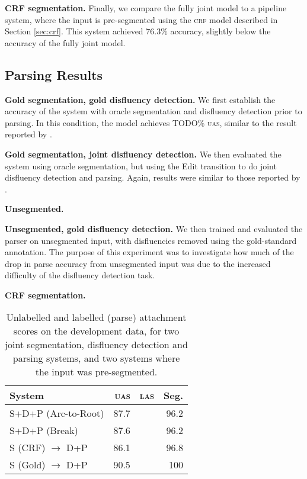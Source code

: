 \documentclass[11pt,letterpaper]{article}
\begin{document}
\textbf{CRF segmentation.} 
Finally, we compare the fully joint model to a pipeline system, where the input
is pre-segmented using the \textsc{crf} model described in Section \ref{sec:crf}.
This system achieved 76.3\% accuracy, slightly below the accuracy of the fully
joint model.

\subsection{Parsing Results}

\textbf{Gold segmentation, gold disfluency detection.}
We first establish the accuracy of the system with oracle segmentation and
disfluency detection prior to parsing.  In this condition, the model achieves
TODO\% \textsc{uas}, similar to the result reported by \citet{honnibal:14}.

\textbf{Gold segmentation, joint disfluency detection.} We then evaluated the
system using oracle segmentation, but using the Edit transition to do joint
disfluency detection and parsing.  Again,  results were similar to those reported
by \citet{honnibal:14}.

\textbf{Unsegmented.}

\textbf{Unsegmented, gold disfluency detection.}  We then trained and evaluated
the parser on unsegmented input, with disfluencies removed using the gold-standard
annotation.  The purpose of this experiment was to investigate how much of the
drop in parse accuracy from unsegmented input was due to the increased difficulty
of the disfluency detection task.

\textbf{CRF segmentation.}

\begin{table}
    \centering
    \small
    \begin{tabular}{l|rrr}
        System & \textsc{uas} & \textsc{las} & Seg. \\
        \hline \hline
        S+D+P (Arc-to-Root) & 87.7 & & 96.2 \\
        S+D+P (Break) & 87.6 & & 96.2 \\
        \hline
        S (CRF) $\rightarrow$ D+P & 86.1 & & 96.8 \\
        S (Gold) $\rightarrow$ D+P & 90.5 & & 100 \\
        \hline
    \end{tabular}
    \caption{\small Unlabelled and labelled (parse) attachment scores on the
        development data, for two joint segmentation, disfluency detection
        and parsing systems,
        and two systems where the input was pre-segmented.
        \label{tab:parse}}
\end{table}
\end{document}
